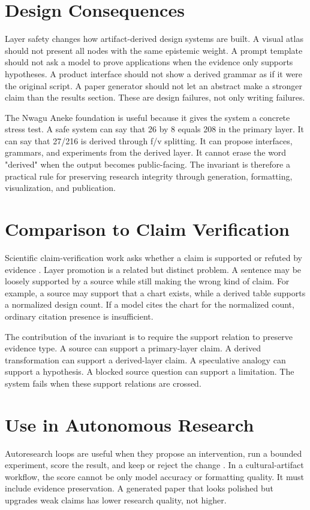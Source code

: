 \documentclass[sigconf,nonacm]{acmart}
\begin{document}
\section{Design Consequences}
Layer safety changes how artifact-derived design systems are built. A visual
atlas should not present all nodes with the same epistemic weight. A prompt
template should not ask a model to prove applications when the evidence only
supports hypotheses. A product interface should not show a derived grammar as if
it were the original script. A paper generator should not let an abstract make a
stronger claim than the results section. These are design failures, not only
writing failures.

The Nwagu Aneke foundation is useful because it gives the system a concrete
stress test. A safe system can say that 26 by 8 equals 208 in the primary
layer. It can say that 27/216 is derived through f/v splitting. It can propose
interfaces, grammars, and experiments from the derived layer. It cannot erase
the word "derived" when the output becomes public-facing. The invariant is
therefore a practical rule for preserving research integrity through generation,
formatting, visualization, and publication.

\section{Comparison to Claim Verification}
Scientific claim-verification work asks whether a claim is supported or refuted
by evidence \cite{wadden2020scifact,gao2023alce}. Layer promotion is a
related but distinct problem. A sentence may be loosely supported by a source
while still making the wrong kind of claim. For example, a source may support
that a chart exists, while a derived table supports a normalized design count.
If a model cites the chart for the normalized count, ordinary citation presence
is insufficient.

The contribution of the invariant is to require the support relation to preserve
evidence type. A source can support a primary-layer claim. A derived
transformation can support a derived-layer claim. A speculative analogy can
support a hypothesis. A blocked source question can support a limitation. The
system fails when these support relations are crossed.

\section{Use in Autonomous Research}
Autoresearch loops are useful when they propose an intervention, run a bounded
experiment, score the result, and keep or reject the change \cite{karpathyAutoresearch}.
In a cultural-artifact workflow, the score cannot be only model accuracy or
formatting quality. It must include evidence preservation. A generated paper
that looks polished but upgrades weak claims has lower research quality, not
higher.
\end{document}
